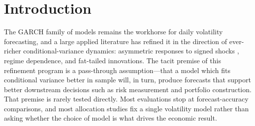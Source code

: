 

\section{Introduction}\label{sec:introduction}

The GARCH family of models \citep{bollerslev1986} remains the workhorse for daily volatility forecasting, and a large applied literature has refined it in the direction of ever-richer conditional-variance dynamics: asymmetric responses to signed shocks \citep{glosten1993,nelson1991}, regime dependence, and fat-tailed innovations. The tacit premise of this refinement program is a pass-through assumption---that a model which fits conditional variance better in sample will, in turn, produce forecasts that support better downstream decisions such as risk measurement and portfolio construction. That premise is rarely tested directly. Most evaluations stop at forecast-accuracy comparisons, and most allocation studies fix a single volatility model rather than asking whether the choice of model is what drives the economic result.

